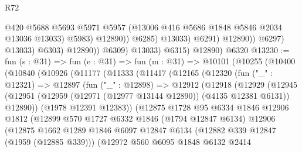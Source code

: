 \begin{lexlean}{R72}
\begin{coremodule}
                                      @420
                                      @5688
                                      @5693
                                      @5971
                                      @5957
                                      (@13006 @416 @5686 @1848 @5846 @2034 @13036 @13033)
                                      @5983)
                                    @12890))
                                @6285)
                              @13033)
                            @6291)
                          @12890))
                      @6297)
                    @13033)
                  @6303)
                @12890))
            @6309)
          @13033)
        @6315)
      @12890)
    @6320
@13230 := fun (s : @31) =>
  fun (e : @31) =>
  fun (m : @31) =>
  @10101
    (@10255
      (@10400
        (@10840
          (@10926
            (@11177
              (@11333
                (@11417
                  (@12165
                    (@12320
                      (fun ("_" : @12321) =>
                      @12897
                        (fun ("_" : @12898) =>
                        @12912
                          (@12918
                            (@12929
                              (@12945
                                (@12951
                                  (@12959 (@12971 (@12977 @13144 @12890)) (@4135 @12381 @6131))
                                  @12890))
                              (@1978 @12391 @12383))
                            (@12875
                              @1728
                              @95
                              @6334
                              @1846
                              @12906
                              @1812
                              (@12899
                                @570
                                @1727
                                @6332
                                @1846
                                (@1794 @12847 @6134)
                                @12906
                                (@12875
                                  @1662
                                  @1289
                                  @1846
                                  @6097
                                  @12847
                                  @6134
                                  (@12882 @339 @12847 (@1959 (@12885 @339)))
                                  (@12972
                                    @560
                                    @6095
                                    @1848
                                    @6132
                                    @2414

\end{coremodule}
\end{lexlean}
